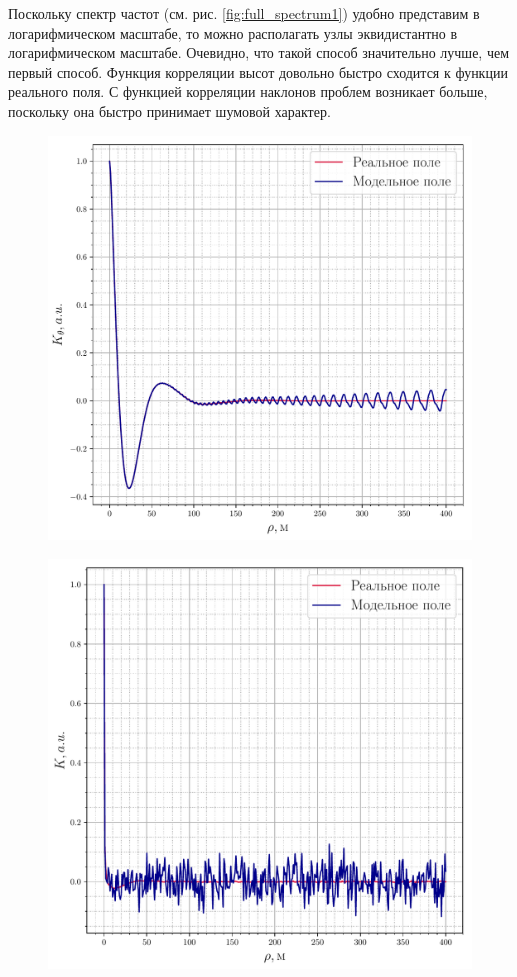 Поскольку спектр частот (см. рис. \ref{fig:full_spectrum1}) удобно представим в логарифмическом масштабе, то можно располагать узлы эквидистантно в логарифмическом масштабе. Очевидно, что такой способ значительно лучше, чем первый способ. Функция корреляции высот довольно быстро сходится к функции реального поля. С функцией корреляции наклонов проблем возникает больше, поскольку она быстро принимает шумовой характер.

\begin{figure}[h!]
	\begin{minipage}{0.49\linewidth}
			\centering
			\includegraphics[width=\linewidth]{fig/correlation_height_slopes1.pdf}
			\label{fig:ch1}		
	\end{minipage}
	\hfill
	\begin{minipage}{0.49\linewidth}
			\centering
			\includegraphics[width=\linewidth]{fig/correlation_angles_slopes1.pdf}

\end{minipage}
\end{figure}
